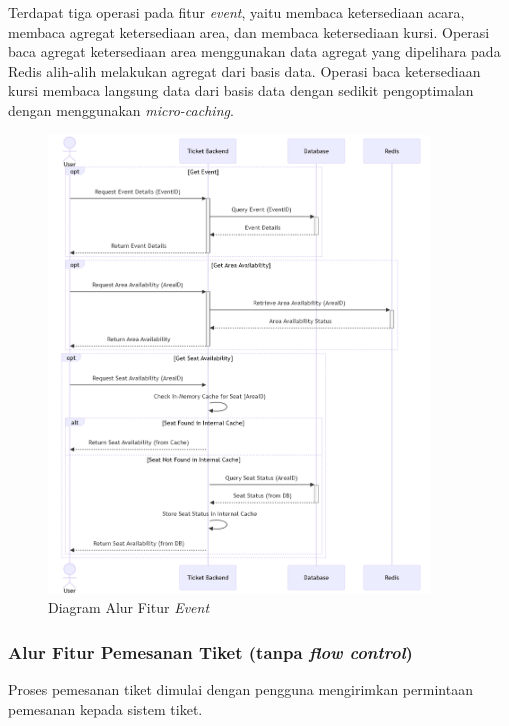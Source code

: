 Terdapat tiga operasi pada fitur \textit{event}, yaitu membaca ketersediaan acara, membaca agregat ketersediaan area, dan membaca ketersediaan kursi. Operasi baca agregat ketersediaan area menggunakan data agregat yang dipelihara pada Redis alih-alih melakukan agregat dari basis data. Operasi baca ketersediaan kursi membaca langsung data dari basis data dengan sedikit pengoptimalan dengan menggunakan \textit{micro-caching}.

\begin{figure}[h]
    \centering
    \includegraphics[width=0.9\textwidth]{resources/chapter-3/event-flow.png}
    \caption{Diagram Alur Fitur \textit{Event}}
    \label{fig:flow-event}
\end{figure}

\pagebreak

\subsubsection{Alur Fitur Pemesanan Tiket (tanpa \textit{flow control})}

Proses pemesanan tiket dimulai dengan pengguna mengirimkan permintaan pemesanan kepada sistem tiket.


